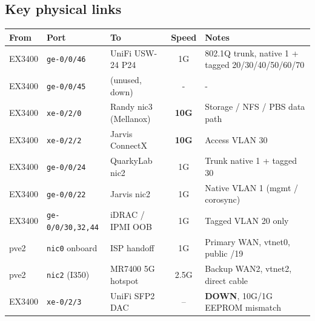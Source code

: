 \documentclass[11pt,letterpaper]{article}
\begin{document}
\subsection{Key physical links}
\begin{center}\footnotesize
\begin{tabularx}{\textwidth}{@{}l l l c X@{}}
\toprule
From & Port & To & Speed & Notes \\ \midrule
EX3400 & \texttt{ge-0/0/46} & UniFi USW-24 P24 & 1G & 802.1Q trunk, native 1 + tagged 20/30/40/50/60/70 \\
EX3400 & \texttt{ge-0/0/45} & (unused, down) & - & - \\
EX3400 & \texttt{xe-0/2/0} & Randy nic3 (Mellanox) & \textbf{10G} & Storage / NFS / PBS data path \\
EX3400 & \texttt{xe-0/2/2} & Jarvis ConnectX & \textbf{10G} & Access VLAN 30 \\
EX3400 & \texttt{ge-0/0/24} & QuarkyLab nic2 & 1G & Trunk native 1 + tagged 30 \\
EX3400 & \texttt{ge-0/0/22} & Jarvis nic2 & 1G & Native VLAN 1 (mgmt / corosync) \\
EX3400 & \texttt{ge-0/0/30,32,44} & iDRAC / IPMI OOB & 1G & Tagged VLAN 20 only \\
pve2 & \texttt{nic0} onboard & ISP handoff & 1G & Primary WAN, vtnet0, public /19 \\
pve2 & \texttt{nic2} (I350) & MR7400 5G hotspot & 2.5G & Backup WAN2, vtnet2, direct cable \\
EX3400 & \texttt{xe-0/2/3} & UniFi SFP2 DAC & -- & \textbf{DOWN}, 10G/1G EEPROM mismatch \\
\bottomrule
\end{tabularx}
\end{center}
\end{document}
